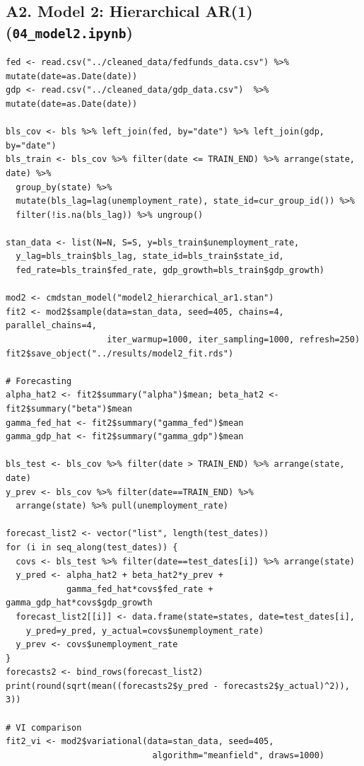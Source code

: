 \documentclass[10pt]{article}
\begin{document}
\subsection*{A2. Model 2: Hierarchical AR(1) (\texttt{04\_model2.ipynb})}
{\scriptsize
\begin{verbatim}
fed <- read.csv("../cleaned_data/fedfunds_data.csv") %>% mutate(date=as.Date(date))
gdp <- read.csv("../cleaned_data/gdp_data.csv")  %>% mutate(date=as.Date(date))

bls_cov <- bls %>% left_join(fed, by="date") %>% left_join(gdp, by="date")
bls_train <- bls_cov %>% filter(date <= TRAIN_END) %>% arrange(state, date) %>%
  group_by(state) %>%
  mutate(bls_lag=lag(unemployment_rate), state_id=cur_group_id()) %>%
  filter(!is.na(bls_lag)) %>% ungroup()

stan_data <- list(N=N, S=S, y=bls_train$unemployment_rate,
  y_lag=bls_train$bls_lag, state_id=bls_train$state_id,
  fed_rate=bls_train$fed_rate, gdp_growth=bls_train$gdp_growth)

mod2 <- cmdstan_model("model2_hierarchical_ar1.stan")
fit2 <- mod2$sample(data=stan_data, seed=405, chains=4, parallel_chains=4,
                    iter_warmup=1000, iter_sampling=1000, refresh=250)
fit2$save_object("../results/model2_fit.rds")

# Forecasting
alpha_hat2 <- fit2$summary("alpha")$mean; beta_hat2 <- fit2$summary("beta")$mean
gamma_fed_hat <- fit2$summary("gamma_fed")$mean
gamma_gdp_hat <- fit2$summary("gamma_gdp")$mean

bls_test <- bls_cov %>% filter(date > TRAIN_END) %>% arrange(state, date)
y_prev <- bls_cov %>% filter(date==TRAIN_END) %>%
  arrange(state) %>% pull(unemployment_rate)

forecast_list2 <- vector("list", length(test_dates))
for (i in seq_along(test_dates)) {
  covs <- bls_test %>% filter(date==test_dates[i]) %>% arrange(state)
  y_pred <- alpha_hat2 + beta_hat2*y_prev +
            gamma_fed_hat*covs$fed_rate + gamma_gdp_hat*covs$gdp_growth
  forecast_list2[[i]] <- data.frame(state=states, date=test_dates[i],
    y_pred=y_pred, y_actual=covs$unemployment_rate)
  y_prev <- covs$unemployment_rate
}
forecasts2 <- bind_rows(forecast_list2)
print(round(sqrt(mean((forecasts2$y_pred - forecasts2$y_actual)^2)), 3))

# VI comparison
fit2_vi <- mod2$variational(data=stan_data, seed=405,
                             algorithm="meanfield", draws=1000)
\end{verbatim}
}
\end{document}
